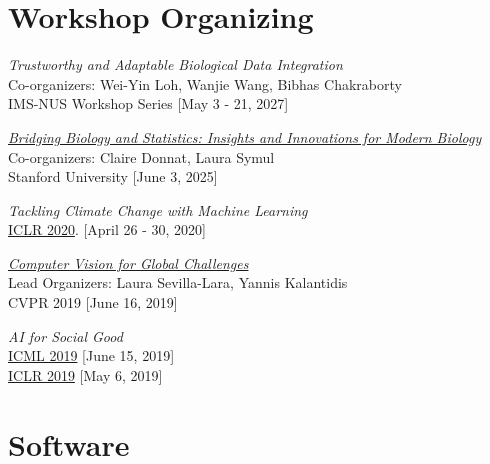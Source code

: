 \documentclass[letterpaper]{article}
\renewenvironment{itemize}{
  \begin{list}{}{
    \setlength{\leftmargin}{1.5em}
  }
}{
  \end{list}
}
\begin{document}
\section*{Workshop Organizing}

\begin{itemize}

\item \textit{Trustworthy and Adaptable Biological Data Integration}\\
Co-organizers: Wei-Yin Loh, Wanjie Wang, Bibhas Chakraborty\\
IMS-NUS Workshop Series [May 3 - 21, 2027]

\item \href{https://www.eventcreate.com/e/stats4modernbiology}{\textit{Bridging Biology and Statistics: Insights and Innovations for Modern Biology}}\\
Co-organizers: Claire Donnat, Laura Symul\\
Stanford University [June 3, 2025]

\item \textit{Tackling Climate Change with Machine Learning}\\
\href{https://www.climatechange.ai/events/iclr2020}{ICLR 2020}. [April 26 - 30, 2020]

\item \href{https://www.cv4gc.org/cvpr2019/}{\textit{Computer Vision for Global Challenges}}\\
Lead Organizers: Laura Sevilla-Lara, Yannis Kalantidis\\
CVPR 2019 [June 16, 2019]

\item \textit{AI for Social Good} \\
\href{https://aiforsocialgood.github.io/icml2019/}{ICML 2019} [June 15, 2019]\\
\href{https://aiforsocialgood.github.io/icml2019}{ICLR 2019} [May 6, 2019]
\end{itemize}

\section*{Software}
\end{document}

